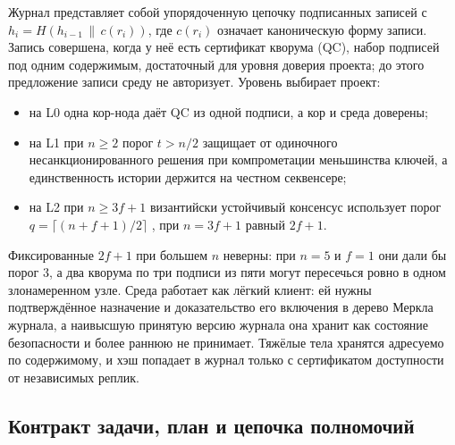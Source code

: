 \documentclass[10pt,a4paper]{article}
\begin{document}
Журнал представляет собой упорядоченную цепочку подписанных записей с $h_i = H(h_{i-1}\,\|\,c(r_i))$, где $c(r_i)$ означает каноническую форму записи. Запись совершена, когда у неё есть сертификат кворума (QC), набор подписей под одним содержимым, достаточный для уровня доверия проекта; до этого предложение записи среду не авторизует. Уровень выбирает проект:
\begin{itemize}
\item на L0 одна кор-нода даёт QC из одной подписи, а кор и среда доверены;
\item на L1 при $n\ge2$ порог $t>n/2$ защищает от одиночного несанкционированного решения при компрометации меньшинства ключей, а единственность истории держится на честном секвенсере;
\item на L2 при $n\ge3f+1$ византийски устойчивый консенсус \cite{pbft,hotstuff} использует порог $q=\lceil (n+f+1)/2\rceil$ \cite{byzquorum}, при $n=3f+1$ равный $2f+1$.
\end{itemize}
Фиксированные $2f+1$ при большем $n$ неверны: при $n=5$ и $f=1$ они дали бы порог 3, а два кворума по три подписи из пяти могут пересечься ровно в одном злонамеренном узле. Среда работает как лёгкий клиент: ей нужны подтверждённое назначение и доказательство его включения в дерево Меркла журнала, а наивысшую принятую версию журнала она хранит как состояние безопасности и более раннюю не принимает. Тяжёлые тела хранятся адресуемо по содержимому, и хэш попадает в журнал только с сертификатом доступности от независимых реплик.

\subsection{Контракт задачи, план и цепочка полномочий}
\end{document}

